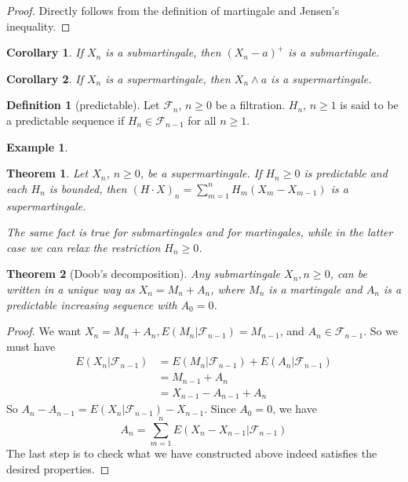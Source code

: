 \documentclass{article}
\newtheorem{Thm}{Theorem}[section]
\newtheorem{Cor}{Corollary}[Thm]
\newtheorem{Eg}{Example}[section]
\theoremstyle{definition}
\newtheorem{Def}{Definition}[section]
\begin{document}
\begin{proof}
Directly follows from the definition of martingale and Jensen's inequality.
\end{proof}
\begin{Cor}
If $X_n$ is a submartingale, then $(X_n-a)^+$ is a submartingale.
\end{Cor}
\begin{Cor}
If $X_n$ is a supermartingale, then $X_n\wedge a$ is a supermartingale.
\end{Cor}
\begin{Def}[predictable]
Let $\mathcal{F}_n$, $n\ge 0$ be a filtration. $H_n$, $n\ge 1$ is said to be a predictable sequence if $H_n\in\mathcal{F}_{n-1}$ for all $n\ge 1$.
\end{Def}
\begin{Eg}

\end{Eg}
\begin{Thm}
Let $X_n$, $n\ge 0$, be a supermartingale. If $H_n\ge0$ is predictable and each $H_n$ is bounded, then $(H\cdot X)_n=\sum_{m=1}^nH_m(X_m-X_{m-1})$ is a supermartingale. \par
The same fact is true for submartingales and for martingales, while in the latter case we can relax the restriction $H_n\ge0$.
\end{Thm}


\begin{Thm}[Doob's decomposition]
Any submartingale $X_n,n\ge 0$, can be written in a unique way as $X_n=M_n+A_n$, where $M_n$ is a martingale and $A_n$ is a predictable increasing sequence with $A_0=0$.
\end{Thm}
\begin{proof}
We want $X_n=M_n+A_n,E(M_n|\mathcal{F}_{n-1})=M_{n-1}$, and $A_n\in\mathcal{F}_{n-1}$. So we must have 
\begin{align*}
E(X_n|\mathcal{F}_{n-1})&=E(M_n|\mathcal{F}_{n-1})+E(A_n|\mathcal{F}_{n-1})\\
&=M_{n-1}+A_n\\
&=X_{n-1}-A_{n-1}+A_n
\end{align*}
So $A_n-A_{n-1}=E(X_n|\mathcal{F}_{n-1})-X_{n-1}$. Since $A_0=0$, we have \[A_n=\sum_{m=1}^nE(X_n-X_{n-1}|\mathcal{F}_{n-1})\]
The last step is to check what we have constructed above indeed satisfies the desired properties.
\end{proof}
\end{document}
